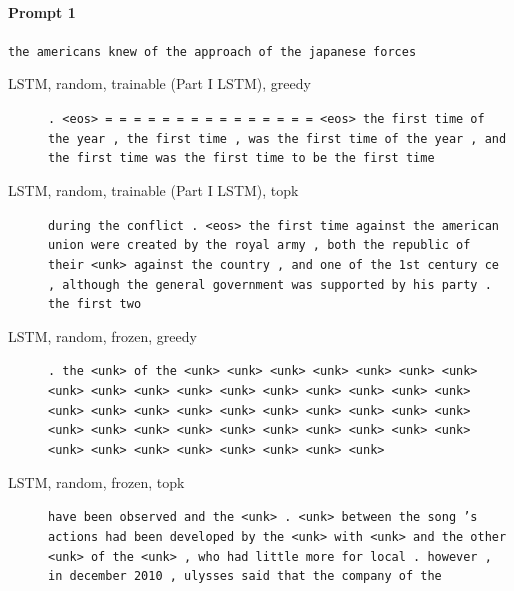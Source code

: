 \paragraph{Prompt 1} \texttt{the americans knew of the approach of the japanese forces}
\begin{description}
\item[LSTM, random, trainable (Part I LSTM), greedy] \texttt{\small . \textless{}eos\textgreater{} = = = = = = = = = = = = = = = \textless{}eos\textgreater{} the first time of the year , the first time , was the first time of the year , and the first time was the first time to be the first time}
\item[LSTM, random, trainable (Part I LSTM), topk] \texttt{\small during the conflict . \textless{}eos\textgreater{} the first time against the american union were created by the royal army , both the republic of their \textless{}unk\textgreater{} against the country , and one of the 1st century ce , although the general government was supported by his party . the first two}
\item[LSTM, random, frozen, greedy] \texttt{\small . the \textless{}unk\textgreater{} of the \textless{}unk\textgreater{} \textless{}unk\textgreater{} \textless{}unk\textgreater{} \textless{}unk\textgreater{} \textless{}unk\textgreater{} \textless{}unk\textgreater{} \textless{}unk\textgreater{} \textless{}unk\textgreater{} \textless{}unk\textgreater{} \textless{}unk\textgreater{} \textless{}unk\textgreater{} \textless{}unk\textgreater{} \textless{}unk\textgreater{} \textless{}unk\textgreater{} \textless{}unk\textgreater{} \textless{}unk\textgreater{} \textless{}unk\textgreater{} \textless{}unk\textgreater{} \textless{}unk\textgreater{} \textless{}unk\textgreater{} \textless{}unk\textgreater{} \textless{}unk\textgreater{} \textless{}unk\textgreater{} \textless{}unk\textgreater{} \textless{}unk\textgreater{} \textless{}unk\textgreater{} \textless{}unk\textgreater{} \textless{}unk\textgreater{} \textless{}unk\textgreater{} \textless{}unk\textgreater{} \textless{}unk\textgreater{} \textless{}unk\textgreater{} \textless{}unk\textgreater{} \textless{}unk\textgreater{} \textless{}unk\textgreater{} \textless{}unk\textgreater{} \textless{}unk\textgreater{} \textless{}unk\textgreater{} \textless{}unk\textgreater{} \textless{}unk\textgreater{} \textless{}unk\textgreater{} \textless{}unk\textgreater{} \textless{}unk\textgreater{} \textless{}unk\textgreater{} \textless{}unk\textgreater{}}
\item[LSTM, random, frozen, topk] \texttt{\small have been observed and the \textless{}unk\textgreater{} . \textless{}unk\textgreater{} between the song 's actions had been developed by the \textless{}unk\textgreater{} with \textless{}unk\textgreater{} and the other \textless{}unk\textgreater{} \textemdash{} of the \textless{}unk\textgreater{} , who had little more for local . however , in december 2010 , ulysses said that the company of the}

\end{description}
